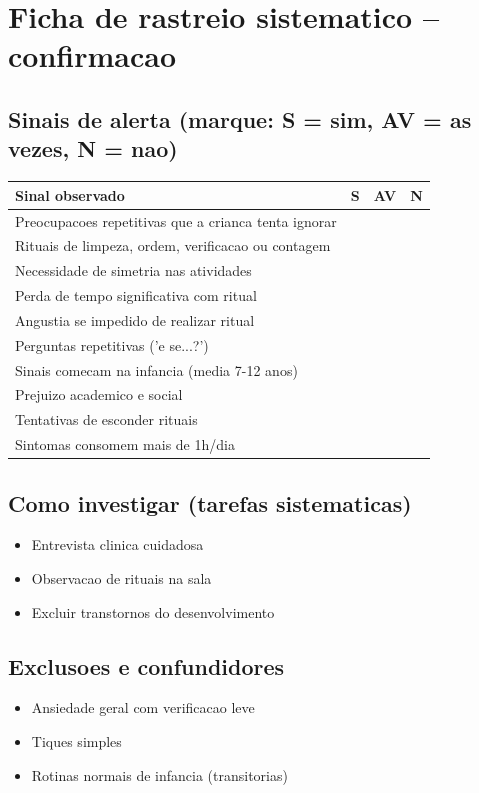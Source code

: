 \documentclass[a4paper,11pt]{book}
\begin{document}
\section*{Ficha de rastreio sistematico -- confirmacao}
\subsection*{Sinais de alerta (marque: S = sim, AV = as vezes, N = nao)}
\begin{tabular}{@{}p{11.5cm}ccc@{}}\toprule
Sinal observado & S & AV & N \\\midrule
Preocupacoes repetitivas que a crianca tenta ignorar & & & \\
Rituais de limpeza, ordem, verificacao ou contagem & & & \\
Necessidade de simetria nas atividades & & & \\
Perda de tempo significativa com ritual & & & \\
Angustia se impedido de realizar ritual & & & \\
Perguntas repetitivas ('e se...?') & & & \\
Sinais comecam na infancia (media 7-12 anos) & & & \\
Prejuizo academico e social & & & \\
Tentativas de esconder rituais & & & \\
Sintomas consomem mais de 1h/dia & & & \\
\bottomrule\end{tabular}
\subsection*{Como investigar (tarefas sistematicas)}
\begin{itemize}
\item Entrevista clinica cuidadosa
\item Observacao de rituais na sala
\item Excluir transtornos do desenvolvimento
\end{itemize}
\subsection*{Exclusoes e confundidores}
\begin{itemize}
\item Ansiedade geral com verificacao leve
\item Tiques simples
\item Rotinas normais de infancia (transitorias)
\end{itemize}
\end{document}
